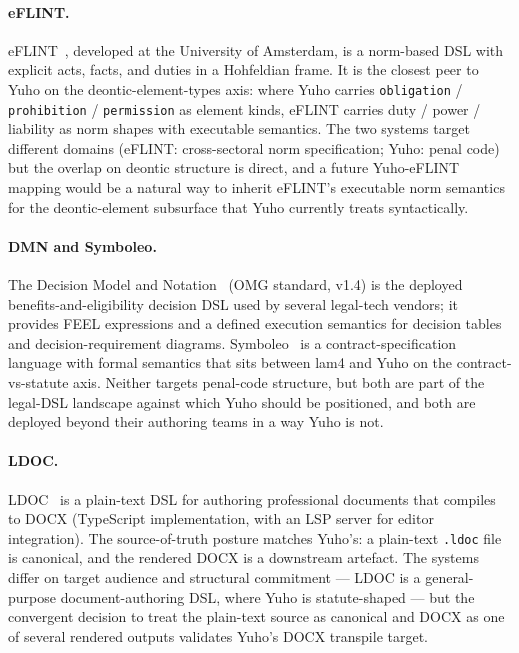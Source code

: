 \paragraph{eFLINT.} eFLINT~\cite{eflint2020}, developed at the
University of Amsterdam, is a norm-based DSL with explicit acts,
facts, and duties in a Hohfeldian frame. It is the closest peer to
Yuho on the deontic-element-types axis: where Yuho carries
\texttt{obligation} / \texttt{prohibition} / \texttt{permission} as
element kinds, eFLINT carries duty / power / liability as norm shapes
with executable semantics. The two systems target different domains
(eFLINT: cross-sectoral norm specification; Yuho: penal code) but the
overlap on deontic structure is direct, and a future Yuho-eFLINT
mapping would be a natural way to inherit eFLINT's executable norm
semantics for the deontic-element subsurface that Yuho currently treats
syntactically.

\paragraph{DMN and Symboleo.} The Decision Model and
Notation~\cite{dmn2022} (OMG standard, v1.4) is the deployed
benefits-and-eligibility decision DSL used by several legal-tech
vendors; it provides FEEL expressions and a defined execution
semantics for decision tables and decision-requirement diagrams.
Symboleo~\cite{symboleo2020} is a contract-specification language
with formal semantics that sits between lam4 and Yuho on the
contract-vs-statute axis. Neither targets penal-code structure, but
both are part of the legal-DSL landscape against which Yuho should be
positioned, and both are deployed beyond their authoring teams in a
way Yuho is not.

\paragraph{LDOC.} LDOC~\cite{ldoc} is a plain-text DSL for authoring
professional documents that compiles to DOCX (TypeScript
implementation, with an LSP server for editor integration). The
source-of-truth posture matches Yuho's: a plain-text \texttt{.ldoc}
file is canonical, and the rendered DOCX is a downstream artefact.
The systems differ on target audience and structural commitment ---
LDOC is a general-purpose document-authoring DSL, where Yuho is
statute-shaped --- but the convergent decision to treat the
plain-text source as canonical and DOCX as one of several rendered
outputs validates Yuho's DOCX transpile target.

